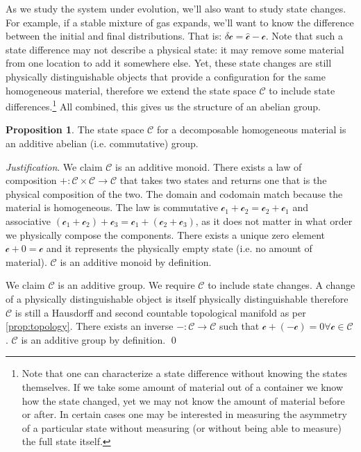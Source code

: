 \documentclass[aps,pra,10pt,twocolumn,floatfix,nofootinbib]{revtex4-1}
\numberwithin{equation}{section}
\theoremstyle{definition}
\newtheorem{prop}[equation]{Proposition}
\newenvironment{justification}{\emph{Justification}.}{\qed}
\begin{document}
As we study the system under evolution, we'll also want to study state changes. For example, if a stable mixture of gas expands, we'll want to know the difference between the initial and final distributions. That is: $\delta\mathcal{c}=\hat{\mathcal{c}}-\mathcal{c}$. Note that such a state difference may not describe a physical state: it may remove some material from one location to add it somewhere else. Yet, these state changes are still physically distinguishable objects that provide a configuration for the same homogeneous material, therefore we extend the state space $\mathcal{C}$ to include state differences.\footnote{Note that one can characterize a state difference without knowing the states themselves. If we take some amount of material out of a container we know how the state changed, yet we may not know the amount of material before or after. In certain cases one may be interested in measuring the asymmetry of a particular state without measuring (or without being able to measure) the full state itself.} All combined, this gives us the structure of an abelian group.

\begin{prop}\label{prop:abelian_group}
The state space $\mathcal{C}$ for a decomposable homogeneous material is an additive abelian (i.e. commutative) group.
\end{prop}

\begin{justification}
We claim $\mathcal{C}$ is an additive monoid. There exists a law of composition $+ : \mathcal{C} \times \mathcal{C} \rightarrow \mathcal{C}$ that takes two states and returns one that is the physical composition of the two. The domain and codomain match because the material is homogeneous. The law is commutative $\mathcal{c}_1 +\mathcal{c}_2 = \mathcal{c}_2+\mathcal{c}_1$ and associative $(\mathcal{c}_1 + \mathcal{c}_2) + \mathcal{c}_3 = \mathcal{c}_1 + (\mathcal{c}_2 + \mathcal{c}_3)$, as it does not matter in what order we physically compose the components. There exists a unique zero element $\mathcal{c} + 0 = \mathcal{c}$ and it represents the physically empty state (i.e. no amount of material). $\mathcal{C}$ is an additive monoid by definition.

We claim $\mathcal{C}$ is an additive group. We require $\mathcal{C}$ to include state changes. A change of a physically distinguishable object is itself physically distinguishable therefore $\mathcal{C}$ is still a Hausdorff and second countable topological manifold as per \ref{prop:topology}. There exists an inverse $- : \mathcal{C} \rightarrow \mathcal{C}$ such that $\mathcal{c} + ( - \mathcal{c}) = 0 \forall \mathcal{c} \in \mathcal{C}$. $\mathcal{C}$ is an additive group by definition. 
\end{justification}
\end{document}
